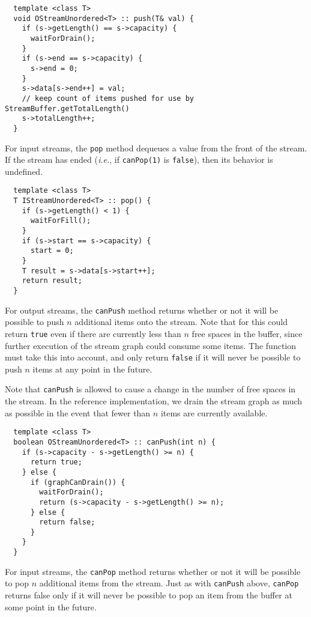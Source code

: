 {\small
\begin{verbatim}
  template <class T>
  void OStreamUnordered<T> :: push(T& val) {
    if (s->getLength() == s->capacity) {
      waitForDrain();
    }
    if (s->end == s->capacity) {
      s->end = 0;
    }
    s->data[s->end++] = val;
    // keep count of items pushed for use by StreamBuffer.getTotalLength()
    s->totalLength++;
  }
\end{verbatim}}

 For input streams, the {\tt pop} method dequeues a value
from the front of the stream.  If the stream has ended ({\it i.e.}, if
{\tt canPop(1)} is {\tt false}), then its behavior is undefined.

{\small
\begin{verbatim}
  template <class T>
  T IStreamUnordered<T> :: pop() {
    if (s->getLength() < 1) {
      waitForFill();
    }
    if (s->start == s->capacity) {
      start = 0;
    }
    T result = s->data[s->start++];
    return result;
  }
\end{verbatim}}

 For output streams, the {\tt canPush} method returns
whether or not it will be possible to push $n$ additional items onto
the stream.  Note that for this could return {\tt true} even if there
are currently less than $n$ free spaces in the buffer, since further
execution of the stream graph could consume some items.  The function
must take this into account, and only return {\tt false} if it will
never be possible to push $n$ items at any point in the future.

Note that {\tt canPush} is allowed to cause a change in the number of
free spaces in the stream.  In the reference implementation, we drain
the stream graph as much as possible in the event that fewer than $n$
items are currently available.

{\small
\begin{verbatim}
  template <class T>
  boolean OStreamUnordered<T> :: canPush(int n) {
    if (s->capacity - s->getLength() >= n) {
      return true;
    } else {
      if (graphCanDrain()) {
        waitForDrain();
        return (s->capacity - s->getLength() >= n);
      } else {
        return false;
      }
    }
  }
\end{verbatim}}

 For input streams, the {\tt canPop} method returns
whether or not it will be possible to pop $n$ additional items from
the stream.  Just as with {\tt canPush} above, {\tt canPop} returns
false only if it will never be possible to pop an item from the buffer
at some point in the future.

